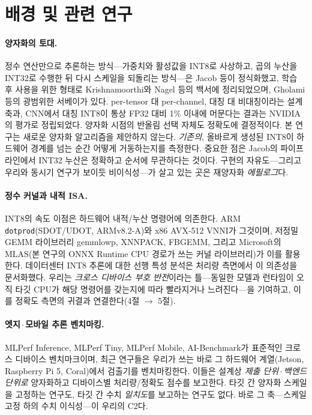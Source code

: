 \documentclass[11pt]{article}
\begin{document}
\section{배경 및 관련 연구}

\paragraph{양자화의 토대.}
정수 연산만으로 추론하는 방식---가중치와 활성값을 INT8로 사상하고, 곱의 누산을 INT32로 수행한 뒤 다시 스케일을 되돌리는 방식---은 Jacob 등\citep{jacob2018}이 정식화했고, 학습 후 사용을 위한 형태로 Krishnamoorthi\citep{krishnamoorthi2018}와 Nagel 등\citep{nagel2021whitepaper}의 백서에 정리되었으며, Gholami 등\citep{gholami2021survey}의 광범위한 서베이가 있다. per-tensor 대 per-channel, 대칭 대 비대칭이라는 설계 축과, CNN에서 대칭 INT8이 통상 FP32 대비 1\% 이내에 머문다는 결과는 NVIDIA의 평가\citep{wu2020}로 정립되었다. 양자화 시점의 반올림 선택 자체도 정확도에 결정적이다\citep{nagel2020adaround}. 본 연구는 새로운 양자화 알고리즘을 제안하지 않는다. \emph{기존의}, 올바르게 생성된 INT8이 하드웨어 경계를 넘는 순간 어떻게 거동하는지를 측정한다. 중요한 점은 Jacob의 파이프라인에서 INT32 누산은 정확하고 순서에 무관하다는 것이다. 구현의 자유도---그리고 우리와 동시기 연구가 보이듯 비이식성---가 살고 있는 곳은 재양자화 \emph{에필로그}다.

\paragraph{정수 커널과 내적 ISA.}
INT8의 속도 이점은 하드웨어 내적/누산 명령어에 의존한다. ARM \texttt{dotprod}(SDOT/UDOT, ARMv8.2-A)\citep{armisa}와 x86 AVX-512 VNNI\citep{intelisa}가 그것이며, 저정밀 GEMM 라이브러리 gemmlowp\citep{gemmlowp}, XNNPACK\citep{xnnpack}, FBGEMM\citep{khudia2021fbgemm}, 그리고 Microsoft의 MLAS\citep{mlas}(본 연구의 ONNX Runtime CPU 경로가 쓰는 커널 라이브러리)가 이를 활용한다. 데이터센터 INT8 추론에 대한 선행 특성 분석\citep{park2018facebook}은 처리량 측면에서 이 의존성을 문서화했다. 우리는 \emph{크로스 디바이스 부호 반전}이라는 틀---동일한 모델과 런타임이 오직 타깃 CPU가 해당 명령어를 갖는지에 따라 빨라지거나 느려진다---을 기여하고, 이를 정확도 측면의 귀결과 연결한다(4절 $\rightarrow$ 5절).

\paragraph{엣지\,$\cdot$\,모바일 추론 벤치마킹.}
MLPerf Inference\citep{reddi2020mlperf}, MLPerf Tiny\citep{banbury2021mlperftiny}, MLPerf Mobile\citep{reddi2020mobile}, AI-Benchmark\citep{ignatov2018, ignatov2019}가 표준적인 크로스 디바이스 벤치마크이며, 최근 연구들은 우리가 쓰는 바로 그 하드웨어 계열(Jetson, Raspberry Pi 5, Coral)에서 검출기를 벤치마킹한다\citep{edgedetection2024, millar2025}. 이들은 설계상 \emph{제출 단위\,$\cdot$\,백엔드 단위로} 양자화하고 디바이스별 처리량/정확도 점수를 보고한다. 타깃 간 양자화 스케일을 고정하는 연구도, 타깃 간 수치 \emph{일치도}를 보고하는 연구도 없다. 바로 그 축---스케일 고정 하의 수치 이식성---이 우리의 C2다.
\end{document}

